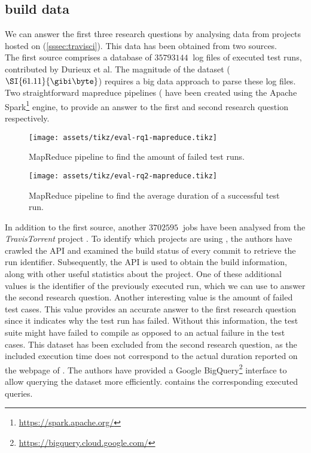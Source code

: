 
\subsection{\travisci{} build data}
We can answer the first three research questions by analysing data from projects hosted on \travisci{} (\cref{sssec:travisci}). This data has been obtained from two sources.\\

\noindent The first source comprises a database \cite{travisanalysis} of $\SI{35793144}{}$ log files of executed test runs, contributed by Durieux et al. The magnitude of the dataset ($\SI{61.11}{\gibi\byte}$) requires a big data approach to parse these log files. Two straightforward \Gls{mapreduce} pipelines ( have been created using the Apache Spark\footnote{\url{https://spark.apache.org/}} engine, to provide an answer to the first and second research question respectively.\\

\begin{figure}[htbp!]
	\centering
	\texttt{[image: assets/tikz/eval-rq1-mapreduce.tikz]}
	\caption{MapReduce pipeline to find the amount of failed test runs.}
	\label{fig:eval-mapreduce-1}
\end{figure}

\begin{figure}[htbp!]
	\centering
	\texttt{[image: assets/tikz/eval-rq2-mapreduce.tikz]}
	\caption{MapReduce pipeline to find the average duration of a successful test run.}
	\label{fig:eval-mapreduce-2}
\end{figure}

\noindent In addition to the first source, another $\SI{3702595}{}$ jobs have been analysed from the \mbox{\emph{TravisTorrent}} project \cite{msr17challenge}. To identify which projects are using \travisci{}, the authors have crawled the \github{} API and examined the build status of every commit to retrieve the run identifier. Subsequently, the \travisci{} API is used to obtain the build information, along with other useful statistics about the project. One of these additional values is the identifier of the previously executed run, which we can use to answer the second research question. Another interesting value is the amount of failed test cases. This value provides an accurate answer to the first research question since it indicates why the test run has failed. Without this information, the test suite might have failed to compile as opposed to an actual failure in the test cases. This dataset has been excluded from the second research question, as the included execution time does not correspond to the actual duration reported on the webpage of \travisci{}. The authors have provided a Google BigQuery\footnote{\url{https://bigquery.cloud.google.com/}} interface to allow querying the dataset more efficiently.  contains the corresponding executed queries.
